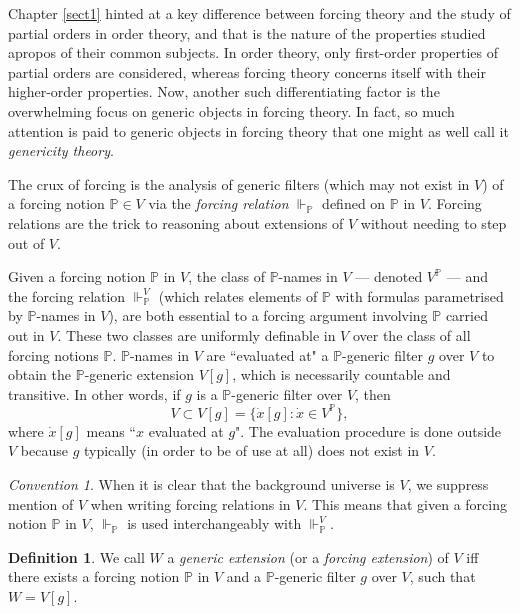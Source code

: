 \documentclass[12pt, twoside]{memoir}
\numberwithin{equation}{section}
\theoremstyle{definition}
\newtheorem{defi}[thm]{Definition}
\theoremstyle{remark}
\newtheorem{con}[thm]{Convention}
\theoremstyle{definition}
\theoremstyle{definition}
\theoremstyle{definition}
\theoremstyle{remark}
\begin{document}
Chapter \ref{sect1} hinted at a key difference between forcing theory and the study of partial orders in order theory, and that is the nature of the properties studied apropos of their common subjects. In order theory, only first-order properties of partial orders are considered, whereas forcing theory concerns itself with their higher-order properties. Now, another such differentiating factor is the overwhelming focus on generic objects in forcing theory. In fact, so much attention is paid to generic objects in forcing theory that one might as well call it \emph{genericity theory}.

The crux of forcing is the analysis of generic filters (which may not exist in $V$) of a forcing notion $\mathbb{P} \in V$ via the \emph{forcing relation} $\Vdash_{\mathbb{P}}$ defined on $\mathbb{P}$ in $V$. Forcing relations are the trick to reasoning about extensions of $V$ without needing to step out of $V$.

Given a forcing notion $\mathbb{P}$ in $V$, the class of $\mathbb{P}$-names in $V$ --- denoted $V^{\mathbb{P}}$ --- and the forcing relation $\Vdash_{\mathbb{P}}^V$ (which relates elements of $\mathbb{P}$ with formulas parametrised by $\mathbb{P}$-names in $V$), are both essential to a forcing argument involving $\mathbb{P}$ carried out in $V$. These two classes are uniformly definable in $V$ over the class of all forcing notions $\mathbb{P}$. $\mathbb{P}$-names in $V$ are ``evaluated at" a $\mathbb{P}$-generic filter $g$ over $V$ to obtain the $\mathbb{P}$-generic extension $V[g]$, which is necessarily countable and transitive. In other words, if $g$ is a $\mathbb{P}$-generic filter over $V$, then
\begin{equation*}
    V \subset V[g] = \{\dot{x}[g] : \dot{x} \in V^{\mathbb{P}}\},
\end{equation*}
where $\dot{x}[g]$ means ``$x$ evaluated at $g$". The evaluation procedure is done outside $V$ because $g$ typically (in order to be of use at all) does not exist in $V$. 

\begin{con}
When it is clear that the background universe is $V$, we suppress mention of $V$ when writing forcing relations in $V$. This means that given a forcing notion $\mathbb{P}$ in $V$, $\Vdash_{\mathbb{P}}$ is used interchangeably with $\Vdash_{\mathbb{P}}^V$.
\end{con}

\begin{defi}
We call $W$ a \emph{generic extension} (or a \emph{forcing extension}) of $V$ iff there exists a forcing notion $\mathbb{P}$ in $V$ and a $\mathbb{P}$-generic filter $g$ over $V$, such that $W = V[g]$.
\end{defi}
\end{document}
